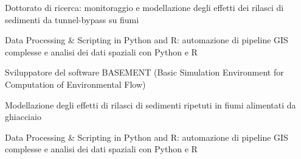 \begin{tightemize}
\item Dottorato di ricerca: monitoraggio e modellazione degli effetti dei rilasci di sedimenti da tunnel-bypass su fiumi
\item Data Processing \& Scripting in Python and R: automazione di pipeline GIS complesse e analisi dei dati spaziali con Python e R
\item Sviluppatore del software BASEMENT (Basic Simulation Environment for Computation of Environmental Flow)
\end{tightemize}
\sectionsep

\begin{tightemize}
\item Modellazione degli effetti di rilasci di sedimenti ripetuti in fiumi alimentati da ghiacciaio
\item Data Processing \& Scripting in Python and R: automazione di pipeline GIS complesse e analisi dei dati spaziali con Python e R
\end{tightemize}
\sectionsep